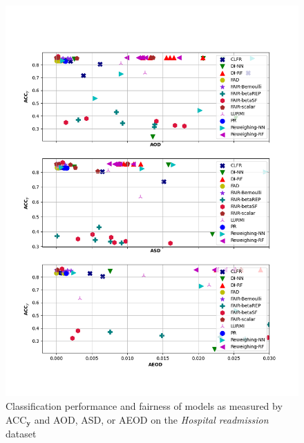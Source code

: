 \documentclass[preprint,12pt]{elsarticle}
\begin{document}
\begin{figure}
	\center
	\includegraphics[angle=0, width=1\textwidth]{Readmission_all_ACC.png}
	\captionsetup{justification=centering}
	\caption{Classification performance and fairness of models as measured by ACC$_\mathbf{y}$ and AOD, ASD, or AEOD on the \textit{Hospital readmission} dataset}
	\label{fig:Readmission all-acc}
	\vskip -0.2in
\end{figure}
\end{document}

